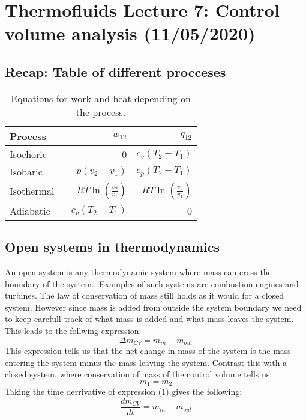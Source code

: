 \documentclass[11pt, a4paper]{article}
\begin{document}
\setcounter{equation}{0}
\setcounter{section}{6}
\section{Thermofluids Lecture 7: Control volume analysis (11/05/2020)}


\subsection{Recap: Table of different procceses}
\begin{table}[h]
  \caption{Equations for work and heat depending on the process.} %
  \centering %
  \begin{tabular}{l|rr} %
    \hline\hline %
  Process & $w_{12}$ & $q_{12}$\\ [0.5ex]
    \hline %
  Isochoric   & 0  & $c_v(T_2 - T_1)$\\ 
  Isobaric    & $p(v_2 - v_1)$ & $c_p(T_2 - T_1)$\\
  Isothermal  & $RT \ln \left(\frac{v_2}{v_1}\right)$ & $RT \ln \left(\frac{v_2}{v_1}\right)$\\
  Adiabatic   & $-c_v(T_2 - T_1)$  & 0\\
  \hline %
  \end{tabular}
  \label{tab:hresult}
\end{table}


\subsection{Open systems in thermodynamics}
An open system is any thermodynamic system where mass can cross the boundary of the system.. Examples of such systems are combustion engines and turbines. The law of conservation of mass still holds as it would for a closed system. However since mass is added from outside the system boundary we need to keep carefull track of what mass is added and what mass leaves the system. This leads to the follwing expression:
\begin{equation}
  \Delta m_{CV} = m_{in} - m_{out}
\end{equation}
This expression tells us that the net change in mass of the system is the mass entering the system minus the mass leaving the system. Contrast this with a closed system, where conservation of mass of the control volume tells us:
\begin{equation}
  m_1 = m_2
\end{equation}
Taking the time derrivative of expression (1) gives the following:
\begin{equation}
  \frac{dm_{CV}}{dt} = \dot{m_{in}} - \dot{m_{out}}
\end{equation}
\end{document}
